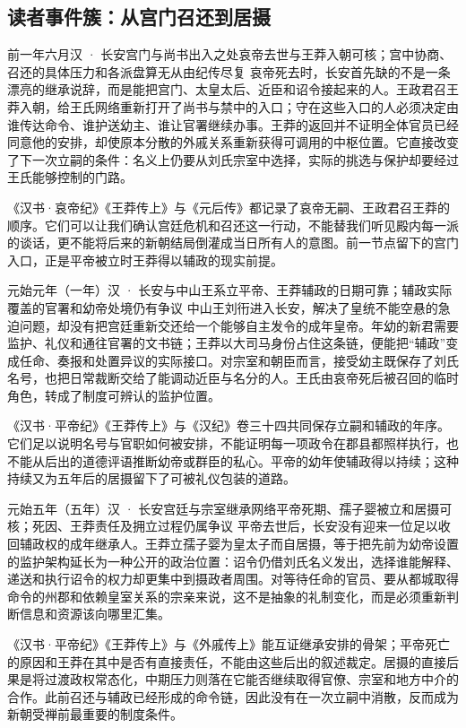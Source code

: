\subsection{读者事件簇：从宫门召还到居摄}

\begin{event}{}{前一年六月}{汉 · 长安宫门与尚书出入之处}{哀帝去世与王莽入朝可核；宫中协商、召还的具体压力和各派盘算无从由纪传尽复}
哀帝死去时，长安首先缺的不是一条漂亮的继承说辞，而是能把宫门、太皇太后、近臣和诏令接起来的人。王政君召王莽入朝，给王氏网络重新打开了尚书与禁中的入口；守在这些入口的人必须决定由谁传达命令、谁护送幼主、谁让官署继续办事。王莽的返回并不证明全体官员已经同意他的安排，却使原本分散的外戚关系重新获得可调用的中枢位置。它直接改变了下一次立嗣的条件：名义上仍要从刘氏宗室中选择，实际的挑选与保护却要经过王氏能够控制的门路。

《汉书·哀帝纪》《王莽传上》与《元后传》都记录了哀帝无嗣、王政君召王莽的顺序。它们可以让我们确认宫廷危机和召还这一行动，不能替我们听见殿内每一派的谈话，更不能将后来的新朝结局倒灌成当日所有人的意图。前一节点留下的宫门入口，正是平帝被立时王莽得以辅政的现实前提。
\end{event}

\begin{event}{}{元始元年（一年）}{汉 · 长安与中山王系}{立平帝、王莽辅政的日期可靠；辅政实际覆盖的官署和幼帝处境仍有争议}
中山王刘衎进入长安，解决了皇统不能空悬的急迫问题，却没有把宫廷重新交还给一个能够自主发令的成年皇帝。年幼的新君需要监护、礼仪和通往官署的文书链；王莽以大司马身份占住这条链，便能把“辅政”变成任命、奏报和处置异议的实际接口。对宗室和朝臣而言，接受幼主既保存了刘氏名号，也把日常裁断交给了能调动近臣与名分的人。王氏由哀帝死后被召回的临时角色，转成了制度可辨认的监护位置。

《汉书·平帝纪》《王莽传上》与《汉纪》卷三十四共同保存立嗣和辅政的年序。它们足以说明名号与官职如何被安排，不能证明每一项政令在郡县都照样执行，也不能从后出的道德评语推断幼帝或群臣的私心。平帝的幼年使辅政得以持续；这种持续又为五年后的居摄留下了可被礼仪包装的道路。
\end{event}

\begin{event}{}{元始五年（五年）}{汉 · 长安宫廷与宗室继承网络}{平帝死期、孺子婴被立和居摄可核；死因、王莽责任及拥立过程仍属争议}
平帝去世后，长安没有迎来一位足以收回辅政权的成年继承人。王莽立孺子婴为皇太子而自居摄，等于把先前为幼帝设置的监护架构延长为一种公开的政治位置：诏令仍借刘氏名义发出，选择谁能解释、递送和执行诏令的权力却更集中到摄政者周围。对等待任命的官员、要从都城取得命令的州郡和依赖皇室关系的宗亲来说，这不是抽象的礼制变化，而是必须重新判断信息和资源该向哪里汇集。

《汉书·平帝纪》《王莽传上》与《外戚传上》能互证继承安排的骨架；平帝死亡的原因和王莽在其中是否有直接责任，不能由这些后出的叙述裁定。居摄的直接后果是将过渡政权常态化，中期压力则落在它能否继续取得官僚、宗室和地方中介的合作。此前召还与辅政已经形成的命令链，因此没有在一次立嗣中消散，反而成为新朝受禅前最重要的制度条件。
\end{event}


